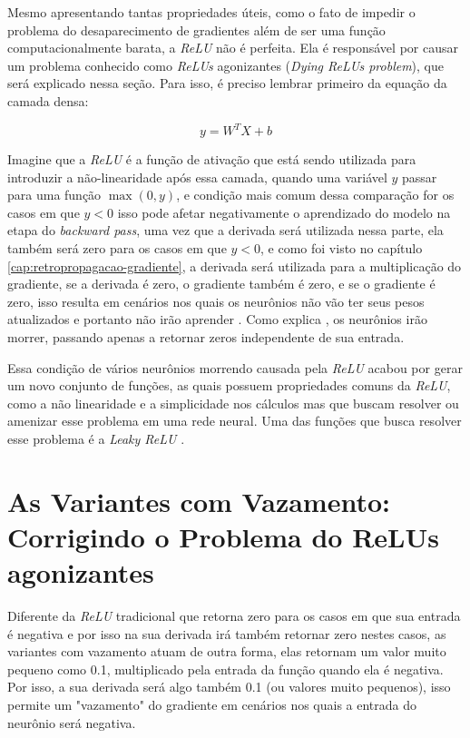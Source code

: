 Mesmo apresentando tantas propriedades úteis, como o fato de impedir o problema do desaparecimento de gradientes além de ser uma função computacionalmente barata, a \textit{ReLU} não é perfeita. Ela é responsável por causar um problema conhecido como \textit{ReLUs} agonizantes (\textit{Dying ReLUs problem}), que será explicado nessa seção. Para isso, é preciso lembrar primeiro da equação da camada densa:

\[
    y = W^T  X + b
\]

Imagine que a \textit{ReLU} é a função de ativação que está sendo utilizada para introduzir a não-linearidade após essa camada, quando uma variável $y$ passar para uma função $\max(0, y)$, e condição mais comum dessa comparação for os casos em que $y < 0$ isso pode afetar negativamente o aprendizado do modelo na etapa do \textit{backward pass}, uma vez que a derivada será utilizada nessa parte, ela também será zero para os casos em que $y < 0$, e como foi visto no capítulo \ref{cap:retropropagacao-gradiente}, a derivada será utilizada para a multiplicação do gradiente, se a derivada é zero, o gradiente também é zero, e se o gradiente é zero, isso resulta em cenários nos quais os neurônios não vão ter seus pesos atualizados e portanto não irão aprender \parencite{DyingReluDouglas}. Como explica \textcite{DyingReluDouglas}, os neurônios irão morrer, passando apenas a retornar zeros independente de sua entrada.

Essa condição de vários neurônios morrendo causada pela \textit{ReLU} acabou por gerar um novo conjunto de funções, as quais possuem propriedades comuns da \textit{ReLU}, como a não linearidade e a simplicidade nos cálculos mas que buscam resolver ou amenizar esse problema em uma rede neural. Uma das funções que busca resolver esse problema é a \textit{Leaky ReLU} \parencite{DyingReluDouglas}.

\section{As Variantes com Vazamento: Corrigindo o Problema do ReLUs agonizantes}

Diferente da \textit{ReLU} tradicional que retorna zero para os casos em que sua entrada é negativa e por isso na sua derivada irá também retornar zero nestes casos, as variantes com vazamento atuam de outra forma, elas retornam um valor muito pequeno como 0.1, multiplicado pela entrada da função quando ela é negativa. Por isso, a sua derivada será algo também 0.1 (ou valores muito pequenos), isso permite um "vazamento" do gradiente em cenários nos quais a entrada do neurônio será negativa.

